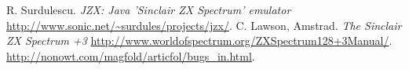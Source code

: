 \documentclass[times, 10pt,twocolumn]{scrartcl}
\begin{document}



\begin{thebibliography}{1}

   R. Surdulescu. {\em JZX: Java 'Sinclair ZX Spectrum' emulator}  \url{http://www.sonic.net/~surdules/projects/jzx/}.
   C. Lawson, Amstrad. {\em The Sinclair ZX Spectrum +3}  \url{http://www.worldofspectrum.org/ZXSpectrum128+3Manual/}.
    \url{http://nonowt.com/magfold/articfol/bugs_in.html}.

\end{thebibliography}
\end{document}
